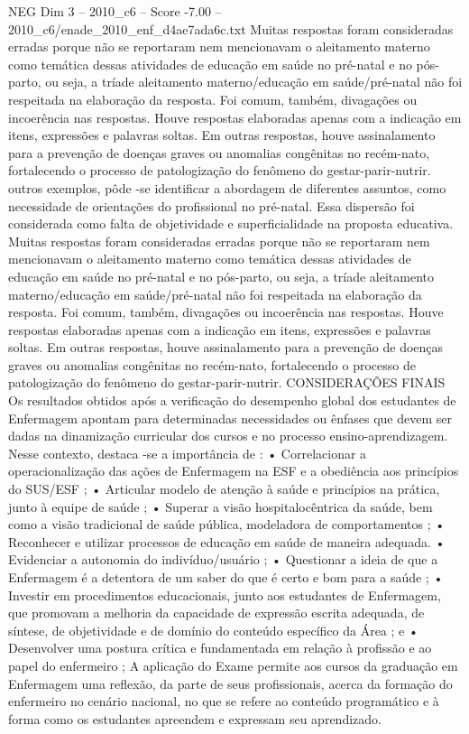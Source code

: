 \begin{textsample}{NEG Dim 3 – 2010\_c6 – Score -7.00 – 2010\_c6/enade\_2010\_enf\_d4ae7ada6c.txt}
Muitas respostas foram consideradas erradas porque não se reportaram nem mencionavam o aleitamento materno como temática dessas atividades de educação em saúde no pré-natal e no pós-parto, ou seja, a tríade aleitamento materno/educação em saúde/pré-natal não foi respeitada na elaboração da resposta.
Foi comum, também, divagações ou incoerência nas respostas.
Houve respostas elaboradas apenas com a indicação em itens, expressões e palavras soltas.
Em outras respostas, houve assinalamento para a prevenção de doenças graves ou anomalias congênitas no recém-nato, fortalecendo o processo de patologização do fenômeno do gestar-parir-nutrir. outros exemplos, pôde -se identificar a abordagem de diferentes assuntos, como necessidade de orientações do profissional no pré-natal.
Essa dispersão foi considerada como falta de objetividade e superficialidade na proposta educativa.
Muitas respostas foram consideradas erradas porque não se reportaram nem mencionavam o aleitamento materno como temática dessas atividades de educação em saúde no pré-natal e no pós-parto, ou seja, a tríade aleitamento materno/educação em saúde/pré-natal não foi respeitada na elaboração da resposta.
Foi comum, também, divagações ou incoerência nas respostas.
Houve respostas elaboradas apenas com a indicação em itens, expressões e palavras soltas.
Em outras respostas, houve assinalamento para a prevenção de doenças graves ou anomalias congênitas no recém-nato, fortalecendo o processo de patologização do fenômeno do gestar-parir-nutrir.
CONSIDERAÇÕES FINAIS Os resultados obtidos após a verificação do desempenho global dos estudantes de Enfermagem apontam para determinadas necessidades ou ênfases que devem ser dadas na dinamização curricular dos cursos e no processo ensino-aprendizagem.
Nesse contexto, destaca -se a importância de : • Correlacionar a operacionalização das ações de Enfermagem na ESF e a obediência aos princípios do SUS/ESF ; • Articular modelo de atenção à saúde e princípios na prática, junto à equipe de saúde ; • Superar a visão hospitalocêntrica da saúde, bem como a visão tradicional de saúde pública, modeladora de comportamentos ; • Reconhecer e utilizar processos de educação em saúde de maneira adequada. • Evidenciar a autonomia do indivíduo/usuário ; • Questionar a ideia de que a Enfermagem é a detentora de um saber do que é certo e bom para a saúde ; • Investir em procedimentos educacionais, junto aos estudantes de Enfermagem, que promovam a melhoria da capacidade de expressão escrita adequada, de síntese, de objetividade e de domínio do conteúdo específico da Área ; e • Desenvolver uma postura crítica e fundamentada em relação à profissão e ao papel do enfermeiro ; A aplicação do Exame permite aos cursos da graduação em Enfermagem uma reflexão, da parte de seus profissionais, acerca da formação do enfermeiro no cenário nacional, no que se refere ao conteúdo programático e à forma como os estudantes apreendem e expressam seu aprendizado.

\end{textsample}
